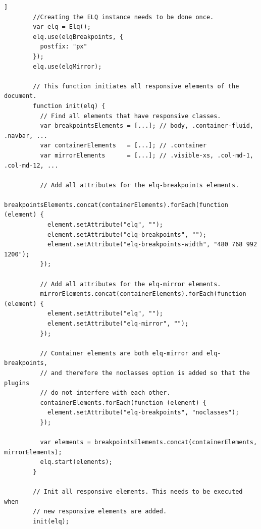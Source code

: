 \documentclass[a4paper,11pt]{kth-mag}
\begin{document}
      \begin{lstlisting}[gobble=8,label={code:bootstrap-init-js},caption={Example of JavaScript code that adds the required \gls{ELQ} attributes dynamically to all responsive elements and initializes them.},captionpos=b]]
        //Creating the ELQ instance needs to be done once.
        var elq = Elq();
        elq.use(elqBreakpoints, {
          postfix: "px"
        });
        elq.use(elqMirror);

        // This function initiates all responsive elements of the document.
        function init(elq) {
          // Find all elements that have responsive classes.
          var breakpointsElements = [...]; // body, .container-fluid, .navbar, ...
          var containerElements   = [...]; // .container
          var mirrorElements      = [...]; // .visible-xs, .col-md-1, .col-md-12, ...

          // Add all attributes for the elq-breakpoints elements.
          breakpointsElements.concat(containerElements).forEach(function (element) {
            element.setAttribute("elq", "");
            element.setAttribute("elq-breakpoints", "");
            element.setAttribute("elq-breakpoints-width", "480 768 992 1200");
          });

          // Add all attributes for the elq-mirror elements.
          mirrorElements.concat(containerElements).forEach(function (element) {
            element.setAttribute("elq", "");
            element.setAttribute("elq-mirror", "");
          });

          // Container elements are both elq-mirror and elq-breakpoints,
          // and therefore the noclasses option is added so that the plugins 
          // do not interfere with each other.
          containerElements.forEach(function (element) {
            element.setAttribute("elq-breakpoints", "noclasses");
          });

          var elements = breakpointsElements.concat(containerElements, mirrorElements);
          elq.start(elements);
        }

        // Init all responsive elements. This needs to be executed when 
        // new responsive elements are added.
        init(elq);
      \end{lstlisting}
\end{document}

